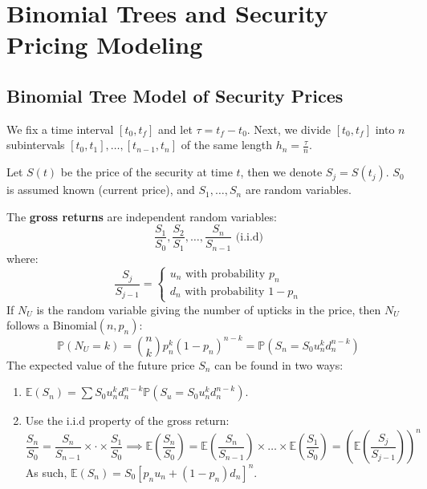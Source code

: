 \section{Binomial Trees and Security Pricing Modeling}
\subsection{Binomial Tree Model of Security Prices}
We fix a time interval \([t_0, t_f]\) and let \(\tau = t_f - t_0\). Next, we divide \([t_0, t_f]\) into \(n\) subintervals \([t_0, t_1], \dots, [t_{n-1}, t_n]\) of the same length \(h_n = \frac{\tau}{n}\).

Let \(S(t)\) be the price of the security at time \(t\), then we denote \(S_j = S(t_j)\). \(S_0\) is assumed known (current price), and \(S_1, \dots, S_n\) are random variables.

The \textbf{gross returns} are independent random variables:
\begin{equation*}
    \frac{S_1}{S_0}, \frac{S_2}{S_1}, \dots, \frac{S_n}{S_{n-1}} \text{ (i.i.d)}
\end{equation*}
where:
\begin{equation*}
    \frac{S_j}{S_{j-1}} = \begin{cases}
        u_n \text{ with probability } p_n \\
        d_n \text{ with probability } 1 - p_n
    \end{cases}
\end{equation*}
If \(N_U\) is the random variable giving the number of upticks in the price, then \(N_U\) follows a \(\text{Binomial}(n, p_n)\):
\begin{equation*}
    \mathbb{P}(N_U = k) = {n\choose k} p_n^k (1-p_n)^{n-k} = \mathbb{P}(S_n = S_0u_n^kd_n^{n-k})
\end{equation*}
The expected value of the future price \(S_n\) can be found in two ways:
\begin{enumerate}
    \item \(\mathbb{E}(S_n) = \sum S_0 u_n^k d_n^{n-k} \mathbb{P}(S_u = S_0u_n^k d_n^{n-k})\).

    \item Use the i.i.d property of the gross return:
    \begin{equation*}
        \frac{S_n}{S_0} = \frac{S_n}{S_{n-1}} \times \cdot \times \frac{S_1}{S_0} \implies \mathbb{E}(\frac{S_n}{S_0}) = \mathbb{E}(\frac{S_n}{S_{n-1}}) \times \dots \times \mathbb{E}(\frac{S_1}{S_0}) = (\mathbb{E}(\frac{S_j}{S_{j-1}}))^n
    \end{equation*}
    As such, \(\mathbb{E}(S_n) = S_0[p_nu_n + (1-p_n)d_n]^n\).
\end{enumerate}

